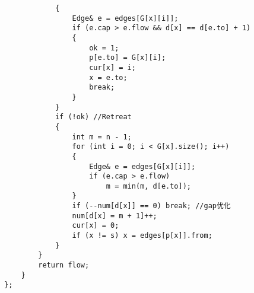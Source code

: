 \documentclass[a4]{article}
\begin{document}
\begin{lstlisting}
            {
                Edge& e = edges[G[x][i]];
                if (e.cap > e.flow && d[x] == d[e.to] + 1)
                {
                    ok = 1;
                    p[e.to] = G[x][i];
                    cur[x] = i;
                    x = e.to;
                    break;
                }
            }
            if (!ok) //Retreat
            {
                int m = n - 1;
                for (int i = 0; i < G[x].size(); i++)
                {
                    Edge& e = edges[G[x][i]];
                    if (e.cap > e.flow)
                        m = min(m, d[e.to]);
                }
                if (--num[d[x]] == 0) break; //gap优化
                num[d[x] = m + 1]++;
                cur[x] = 0;
                if (x != s) x = edges[p[x]].from;
            }
        }
        return flow;
    }
};
\end{lstlisting}
\end{document}
